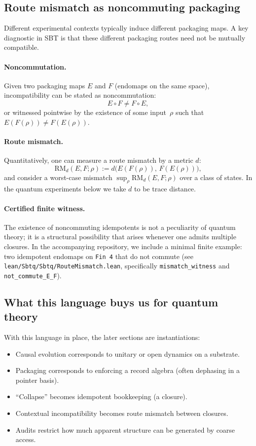 \subsection{Route mismatch as noncommuting packaging}

Different experimental contexts typically induce different packaging maps.
A key diagnostic in SBT is that these different packaging routes need not be mutually compatible.

\paragraph{Noncommutation.}
Given two packaging maps $E$ and $F$ (endomaps on the same space), incompatibility can be stated as noncommutation:
\[
E\circ F \neq F\circ E,
\]
or witnessed pointwise by the existence of some input~$\rho$ such that $E(F(\rho))\neq F(E(\rho))$.

\paragraph{Route mismatch.}
Quantitatively, one can measure a route mismatch by a metric $d$:
\[
\mathrm{RM}_d(E,F;\rho) := d\big(E(F(\rho)),\,F(E(\rho))\big),
\]
and consider a worst-case mismatch $\sup_\rho \mathrm{RM}_d(E,F;\rho)$ over a class of states.
In the quantum experiments below we take $d$ to be trace distance.

\paragraph{Certified finite witness.}
The existence of noncommuting idempotents is not a peculiarity of quantum theory; it is a structural possibility that arises whenever one admits multiple closures.
In the accompanying repository, we include a minimal finite example: two idempotent endomaps on \texttt{Fin~4} that do not commute (see \texttt{lean/Sbtq/Sbtq/RouteMismatch.lean}, specifically \texttt{mismatch\_witness} and \texttt{not\_commute\_E\_F}).

\subsection{What this language buys us for quantum theory}

With this language in place, the later sections are instantiations:
\begin{itemize}
  \item Causal evolution corresponds to unitary or open dynamics on a substrate.
  \item Packaging corresponds to enforcing a record algebra (often dephasing in a pointer basis).
  \item ``Collapse'' becomes idempotent bookkeeping (a closure).
  \item Contextual incompatibility becomes route mismatch between closures.
  \item Audits restrict how much apparent structure can be generated by coarse access.
\end{itemize}
